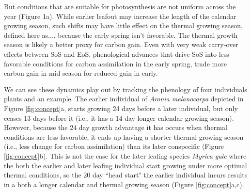\documentclass[12 pt]{article}
\begin{document}

But conditions that are suitable for photosynthesis are not uniform across the year (Figure 1a). While earlier leafout may increase the length of the calendar growing season, such shifts may have little effect on the thermal growing season, defined here as....\citep{} because the early spring isn't favorable. The thermal growth season is likely a better proxy for carbon gain. Even with very weak carry-over effects between SoS and EoS, phenological advances that drive SoS into less favorable conditions for carbon assimilation in the early spring, trade more carbon gain in mid season for reduced gain in early. 

We can see these dynamics play out by tracking the phenology of four individuals plants and an example. The earlier individual of \emph{Aronia melanocarpa} depicted in Figure \ref{fig:concept}a, starts growing 24 days before a later individual, but only ceases 13 days before it (i.e., it has a 14 day longer calendar growing season). However, because the 24 day growth advantage it has occurs when thermal conditions are less favorable, it ends up having a shorter thermal growing season (i.e., less change for carbon assimilation) than its later conspecific (Figure \ref{fig:concept}b). This is not the case for the later leafing species \emph{Myrica gale} where the both the earlier and later leafing individual start growing under more optimal thermal conditions, so the 20 day ``head start" the earlier individual incurs results in a both a longer calendar and thermal growing season (Figure \ref{fig:concept}a,c). 
\end{document}
